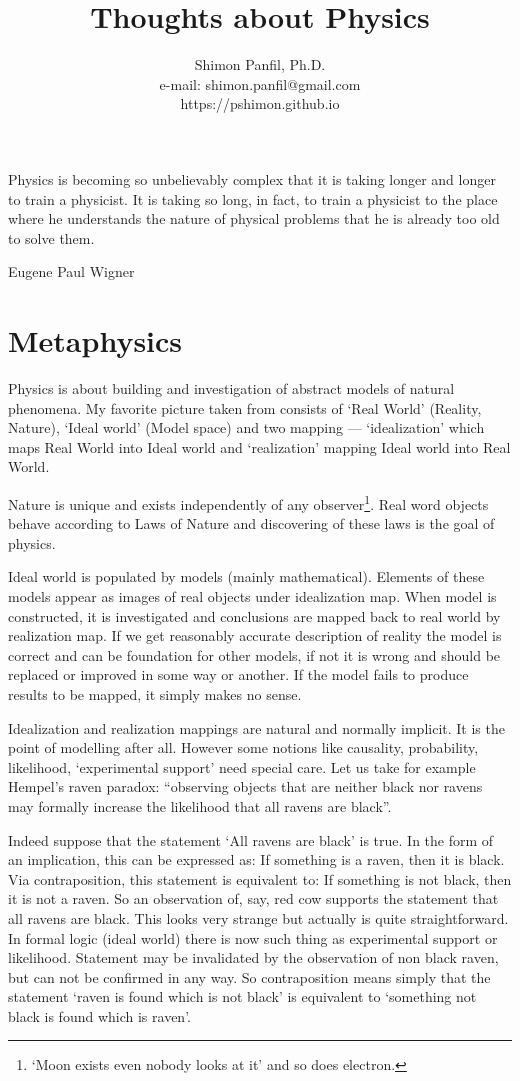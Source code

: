 \documentclass[11pt]{book}
\title{Thoughts about Physics}
\author{Shimon Panfil, Ph.D.\\
e-mail: shimon.panfil@gmail.com\\
https://pshimon.github.io}
\begin{document}
  

\maketitle
\epigraph{Physics is becoming so unbelievably complex that it is taking longer
and longer to train a physicist. It is taking so long, in fact, to train a 
physicist to the place where he understands the nature of physical problems that 
he is already too old to solve them.}{Eugene Paul Wigner}
\tableofcontents                        
\chapter{Metaphysics }
\label {metaphysics}
Physics is about building and investigation of abstract models  of natural phenomena.
My favorite picture taken from \cite{strugatsky} consists of `Real World' (Reality, Nature), `Ideal world' (Model space)
and two mapping --- `idealization' which maps Real World into Ideal world and `realization'
mapping Ideal world into Real World. 

Nature is unique and exists independently of any observer\footnote{`Moon exists even nobody looks at it' and so does electron.}. Real word objects behave 
according to Laws of Nature and discovering of these laws is the goal of physics.

Ideal world is populated by models (mainly mathematical). Elements of these models
appear as images of real objects under idealization map. When model is constructed, 
it is investigated and conclusions are mapped back to real world by realization map. 
If we get reasonably accurate description of reality the model is correct and can be foundation 
for other models, if not it is wrong and should be replaced or improved in some way or another.
If the model fails to produce results to be mapped, it simply makes no sense.

Idealization and realization mappings are natural and normally implicit. It is
the point of modelling after all. However some notions like causality, probability, likelihood,
`experimental support' need special care. Let us take for example  Hempel's raven paradox: ``observing
objects that are neither black nor ravens may formally increase the likelihood 
that all ravens are black''. 

Indeed suppose that the statement `All ravens are black' is true.
In the form of an 
implication, this can be expressed as: If something is a raven, then it 
is black. Via contraposition, this statement is equivalent to: If something is 
not black, then it is not a raven. So an observation of, say, red cow supports 
the statement that all ravens are black. This looks very strange but actually is quite
straightforward. In formal logic (ideal world) there is now such thing as experimental support or
likelihood. Statement may be invalidated by the observation of non black raven, but can not be confirmed in any way. So contraposition means simply that the statement `raven is found which is not black' is equivalent to `something not black is found which is raven'. 
\end{document}
